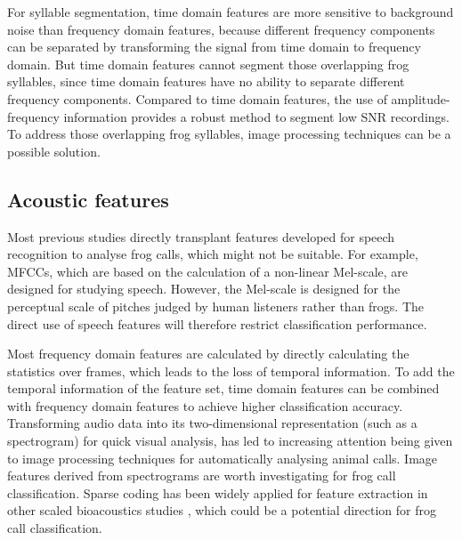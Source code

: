 For syllable segmentation, time domain features are more sensitive to background noise than frequency domain features, because different frequency components can be separated by transforming the signal from time domain to frequency domain. But time domain features cannot segment those overlapping frog syllables, since time domain features have no ability to separate different frequency components. Compared to time domain features, the use of amplitude-frequency information provides a robust method to segment low SNR recordings. To address those overlapping frog syllables, image processing techniques can be a possible solution. 




\subsection{Acoustic features}
Most previous studies directly transplant features developed for speech recognition to analyse frog calls, which might not be suitable. For example, MFCCs, which are based on the calculation of a non-linear Mel-scale, are designed for studying speech. However, the Mel-scale is designed for the perceptual scale of pitches judged by human listeners rather than frogs. The direct use of speech features will therefore restrict classification performance. 

Most frequency domain features are calculated by directly calculating the statistics over frames, which leads to the loss of temporal information. To add the temporal information of the feature set, time domain features can be combined with frequency domain features to achieve higher classification accuracy. Transforming audio data into its two-dimensional representation (such as a spectrogram) for quick visual analysis, has led to increasing attention being given to image processing techniques for automatically analysing animal calls. Image features derived from spectrograms are worth investigating for frog call classification. Sparse coding has been widely applied for feature extraction in other scaled bioacoustics studies \citep{glotin2013sparse, razik2015sparse}, which could be a potential direction for frog call classification.

